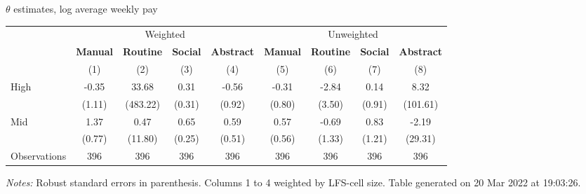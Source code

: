 \begin{center}
\begin{threeparttable}[!h]
\caption{$ \theta $ estimates, log average weekly pay}
\begin{tabular}{lcccccccc}
\toprule
\toprule
& \multicolumn{4}{c}{Weighted} & \multicolumn{4}{c}{Unweighted} \\
&\multicolumn{1}{c}{\textbf{Manual}}&\multicolumn{1}{c}{\textbf{Routine}}&\multicolumn{1}{c}{\textbf{Social}}&\multicolumn{1}{c}{\textbf{Abstract}}&\multicolumn{1}{c}{\textbf{Manual}}&\multicolumn{1}{c}{\textbf{Routine}}&\multicolumn{1}{c}{\textbf{Social}}&\multicolumn{1}{c}{\textbf{Abstract}} \\
\textbf{}&\multicolumn{1}{c}{(1)}&\multicolumn{1}{c}{(2)}&\multicolumn{1}{c}{(3)}&\multicolumn{1}{c}{(4)}&\multicolumn{1}{c}{(5)}&\multicolumn{1}{c}{(6)}&\multicolumn{1}{c}{(7)}&\multicolumn{1}{c}{(8)} \\
\midrule
High                &       -0.35&       33.68&        0.31&       -0.56&       -0.31&       -2.84&        0.14&        8.32\\
                    &      (1.11)&    (483.22)&      (0.31)&      (0.92)&      (0.80)&      (3.50)&      (0.91)&    (101.61)\\
Mid                 &        1.37&        0.47&        0.65&        0.59&        0.57&       -0.69&        0.83&       -2.19\\
                    &      (0.77)&     (11.80)&      (0.25)&      (0.51)&      (0.56)&      (1.33)&      (1.21)&     (29.31)\\
Observations        &         396&         396&         396&         396&         396&         396&         396&         396\\
\bottomrule
\bottomrule
\end{tabular}
\begin{tablenotes}
\item \footnotesize \textit{Notes:} Robust standard errors in parenthesis. Columns 1 to 4 weighted by LFS-cell size. Table generated on 20 Mar 2022 at 19:03:26.
\end{tablenotes}
\end{threeparttable}
\end{center}
